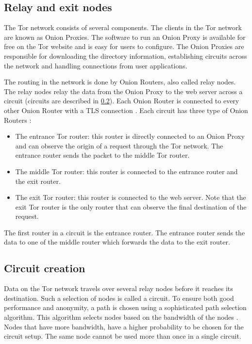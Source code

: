 \documentclass{article}
\begin{document}
	\subsection{Relay and exit nodes}
		The Tor network consists of several components. The clients in the Tor network are known as Onion Proxies. The software to run an Onion Proxy is available for free on the Tor website \cite{torprojectwebsite} and is easy for users to configure. The Onion Proxies are responsible for downloading the directory information, establishing circuits across the network and handling connections from user applications.
		
		The routing in the network is done by Onion Routers, also called relay nodes. The relay nodes relay the data from the Onion Proxy to the web server across a circuit (circuits are described in \ref{ss:tor_circuit}). Each Onion Router is connected to every other Onion Router with a TLS connection \cite{tlsprotocol}. Each circuit has three type of Onion Routers \cite{mccoy2008shining}:
		
		\begin{itemize}
			\item{The entrance Tor router:} this router is directly connected to an Onion Proxy and can observe the origin of a request through the Tor network. The entrance router sends the packet to the middle Tor router.
			\item{The middle Tor router:} this router is connected to the entrance router and the exit router.
			\item{The exit Tor router:} this router is connected to the web server. Note that the exit Tor router is the only router that can observe the final destination of the request.
		\end{itemize}
		
		The first router in a circuit is the entrance router. The entrance router sends the data to one of the middle router which forwards the data to the exit router.
			
	\subsection{Circuit creation}
		\label{ss:tor_circuit}
		
		Data on the Tor network travels over several relay nodes before it reaches its destination. Such a selection of nodes is called a circuit. To ensure both good performance and anonymity, a path is chosen using a sophisticated path selection algorithm. This algorithm selects nodes based on the bandwidth of the nodes \cite{wang2012congestion}. Nodes that have more bandwidth, have a higher probability to be chosen for the circuit setup. The same node cannot be used more than once in a single circuit.
		
\end{document}
